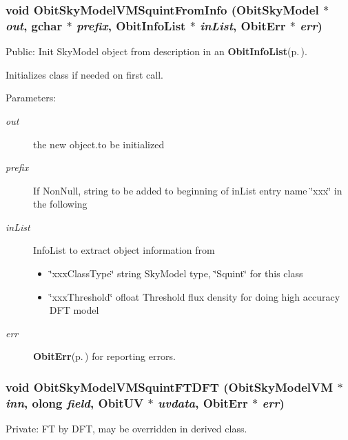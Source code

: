 \subsubsection{\setlength{\rightskip}{0pt plus 5cm}void Obit\-Sky\-Model\-VMSquint\-From\-Info ({\bf Obit\-Sky\-Model} $\ast$ {\em out}, gchar $\ast$ {\em prefix}, {\bf Obit\-Info\-List} $\ast$ {\em in\-List}, {\bf Obit\-Err} $\ast$ {\em err})}\label{ObitSkyModelVMSquint_8c_a15}


Public: Init Sky\-Model object from description in an {\bf Obit\-Info\-List}{\rm (p.\,\pageref{structObitInfoList})}. 

Initializes class if needed on first call. \begin{Desc}
\item[Parameters:]
\begin{description}
\item[{\em out}]the new object.to be initialized \item[{\em prefix}]If Non\-Null, string to be added to beginning of in\-List entry name \char`\"{}xxx\char`\"{} in the following \item[{\em in\-List}]Info\-List to extract object information from \begin{itemize}
\item \char`\"{}xxx\-Class\-Type\char`\"{} string Sky\-Model type, \char`\"{}Squint\char`\"{} for this class \item \char`\"{}xxx\-Threshold\char`\"{} ofloat Threshold flux density for doing high accuracy DFT model \end{itemize}
\item[{\em err}]{\bf Obit\-Err}{\rm (p.\,\pageref{structObitErr})} for reporting errors. \end{description}
\end{Desc}
\subsubsection{\setlength{\rightskip}{0pt plus 5cm}void Obit\-Sky\-Model\-VMSquint\-FTDFT ({\bf Obit\-Sky\-Model\-VM} $\ast$ {\em inn}, {\bf olong} {\em field}, {\bf Obit\-UV} $\ast$ {\em uvdata}, {\bf Obit\-Err} $\ast$ {\em err})}\label{ObitSkyModelVMSquint_8c_a5}


Private: FT by DFT, may be overridden in derived class. 

